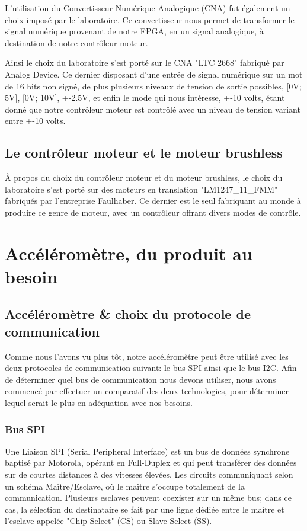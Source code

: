 \documentclass[french,a4paper,12pt]{report}
\begin{document}
			L'utilisation du Convertisseur Numérique Analogique (CNA) fut également un choix imposé par le laboratoire.
			Ce convertisseur nous permet de transformer le signal numérique provenant de notre FPGA, en un signal analogique, à destination de notre contrôleur moteur.
			
			Ainsi le choix du laboratoire s'est porté sur le CNA "LTC 2668" fabriqué par Analog Device.
			Ce dernier disposant d'une entrée de signal numérique sur un mot de 16 bits non signé, de plus plusieurs niveaux de tension de sortie possibles, [0V; 5V], [0V; 10V], +-2.5V, et enfin le mode qui nous intéresse, +-10 volts, étant donné que notre contrôleur moteur est contrôlé avec un niveau de tension variant entre +-10 volts.
	
			\section{Le contrôleur moteur et le moteur brushless}
			
			À propos du choix du contrôleur moteur et du moteur brushless, le choix du laboratoire s'est porté sur des moteurs en translation "LM1247\_11\_FMM" fabriqués par l'entreprise Faulhaber. Ce dernier est le seul fabriquant au monde à produire ce genre de moteur, avec un contrôleur offrant divers modes de contrôle.
			
			
		\chapter{Accéléromètre, du produit au besoin}
			
			\section{Accéléromètre \& choix du protocole de communication}
				Comme nous l'avons vu plus tôt, notre accéléromètre peut être utilisé avec les deux protocoles de communication suivant: le bus SPI ainsi que le bus I2C. Afin de déterminer quel bus de communication nous devons utiliser, nous avons commencé par effectuer un comparatif des deux technologies, pour déterminer lequel serait le plus en adéquation avec nos besoins.
				
			\subsection{Bus SPI}
			
			Une Liaison SPI (Serial Peripheral Interface) est un bus de données synchrone baptisé par Motorola, opérant en Full-Duplex et qui peut transférer des données sur de courtes distances à des vitesses élevées. Les circuits communiquant selon un schéma Maître/Esclave, où le maître s'occupe totalement de la communication. Plusieurs esclaves peuvent coexister sur un même bus; dans ce cas, la sélection du destinataire se fait par une ligne dédiée entre le maître et l'esclave appelée "Chip Select" (CS) ou Slave Select (SS).
 
\end{document}
